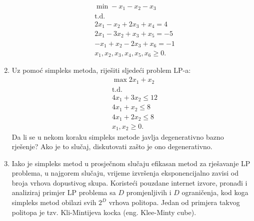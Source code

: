 \documentclass[b5paper, utf8, 11pt, colorlinks]{book}
\theoremstyle{definition}
\begin{document}
\begin{enumerate}
\begin{align*}
		& \min -x_1 - x_2 - x_3 \\
		&  {\mbox{t.d.}} \\
		& 2 x_1 - x_2 + 2 x_3 + x_4 = 4 \\
		& 2x_1 - 3x_2 + x_3 + x_5 =  -5 \\
		& -x_1 + x_2 - 2x_3 + x_6 = -1 \\
		& x_1, x_2, x_3, x_4, x_5, x_6 \geq 0.	
	\end{align*}
	\item Uz pomoć simpleks metoda, riješiti sljedeći problem LP-a:
	\begin{align*}
		&\max 2x_1 + x_2 \\
		&   {\mbox{t.d.}} \\
		&4 x_1 + 3 x_2 \leq 12 \\
		& 4 x_1 + x_2 \leq 8 \\
		& 4 x_1 + 2 x_2 \leq 8 \\
		& x_1, x_2 \geq 0.
	\end{align*}
	Da li se u nekom koraku simpleks metode javlja degenerativno bazno rješenje? Ako je to slučaj, diskutovati zašto je ono degenerativno. 
	\item Iako je simpleks metod u prosječnom slučaju efikasan metod za rješavanje LP problema, u najgorem slučaju, vrijeme izvršenja eksponencijalno zavisi od broja vrhova dopustivog skupa. Koristeći pouzdane internet izvore, pronađi i analiziraj primjer LP problema sa $D$ promjenljivih i $D$ ograničenja, kod koga simpleks metod obilazi svih $2^D$ vrhova politopa. Jedan od primjera takvog politopa je tzv. Kli-Mintijeva kocka (eng. Klee-Minty cube).
	
\end{enumerate}
\end{document}
